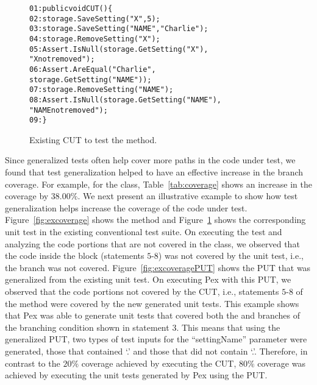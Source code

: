 \begin{figure}[t]
\begin{CodeOut}
\begin{alltt}
01: public void CUT() \{
02: \hspace*{0.07in}storage.SaveSetting("X",5);
03: \hspace*{0.07in}storage.SaveSetting("NAME","Charlie");
04: \hspace*{0.07in}storage.RemoveSetting("X");
05: \hspace*{0.07in}Assert.IsNull(storage.GetSetting("X"),
\hspace*{1.0in}"X not removed");
06: \hspace*{0.07in}Assert.AreEqual("Charlie", 
\hspace{1.0in}storage.GetSetting( "NAME" ) );
07: \hspace*{0.07in}storage.RemoveSetting("NAME");
08: \hspace*{0.07in}Assert.IsNull( storage.GetSetting("NAME"), 
\hspace*{1.8in}"NAME not removed" ); 
09: \hspace*{0.02in}\}
\end{alltt}
\end{CodeOut}
\caption{Existing CUT to test the  method.}%
\label{fig:excoveragetest}%
\end{figure}

Since generalized tests often help cover more paths in the code under test, we found that test generalization helped to have an effective increase in the branch coverage. For example, for the  class, Table~\ref{tab:coverage} shows an increase in the coverage by $38.00\%$. We next present an illustrative example to show how test generalization helps increase the coverage of the code under test. Figure~\ref{fig:excoverage} shows the  method and Figure~\ref{fig:excoveragetest} shows the corresponding unit test in the existing conventional test suite. On executing the test and analyzing the code portions that are not covered in the  class, we observed that the code inside the  block (statements $5$-$8$) was not covered by the unit test, i.e., the  branch was not covered. Figure~\ref{fig:excoveragePUT} shows the PUT that was generalized from the existing unit test. On executing Pex with this PUT, we observed that the code portions not covered by the CUT, i.e., statements $5$-$8$ of the  method were covered by the new generated unit tests. This example shows that Pex was able to generate unit tests that covered both the  and  branches of the branching condition shown in statement $3$. This means that using the generalized PUT, two types of test inputs for the ``settingName'' parameter were generated, those that contained `.' and those that did not contain `.'. Therefore, in contrast to the $20\%$ coverage achieved by executing the CUT, $80\%$ coverage was achieved by executing the unit tests generated by Pex using the PUT. 

